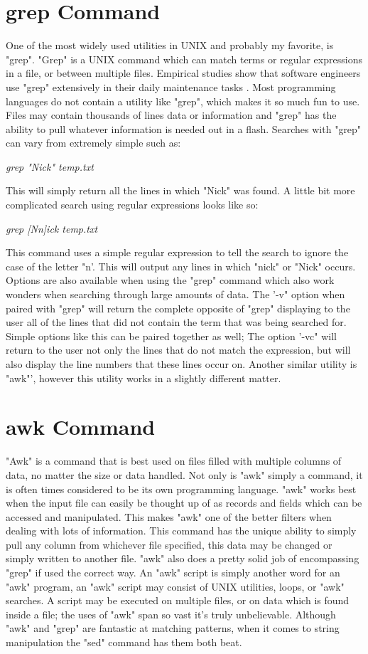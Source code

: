 \documentclass{article}
\begin{document}
\section{grep Command}       
One of the most widely used utilities in UNIX and probably my favorite, is "grep". "Grep" is a UNIX 
command which can match terms or regular expressions in a file, or between multiple files. Empirical 
studies show that software engineers use "grep" extensively in their daily maintenance tasks \cite{singer1997s}. Most programming languages do not contain a utility like "grep", which makes it so 
much fun to use. Files may contain thousands of lines data or information and "grep" has the ability to pull 
whatever information is needed out in a flash. Searches with "grep" can vary from extremely simple such 
as:\par
\textit{\large grep "Nick" temp.txt}\par 
This will simply return all the lines in which "Nick" was found. A little bit more complicated search using 
regular expressions looks like so:\par   
\textit{\large grep [Nn]ick temp.txt}\par
This command uses a simple regular expression to tell the search to ignore the case of the letter "n'. This 
will output any lines in which "nick" or "Nick" occurs. Options are also available when using the "grep" 
command which also work wonders when searching through large amounts of data. The '-v" option 
when paired with "grep" will return the complete opposite of "grep" displaying to the user all of the lines 
that did not contain the term that was being searched for. Simple options like this can be paired 
together as well; The option '-vc" will return to the user not only the lines that do not match the 
expression, but will also display the line numbers that these lines occur on. Another similar utility is 
"awk"', however this utility works in a slightly different matter.
\section{awk Command}
		"Awk" is a command that is best used on files filled with multiple columns of data, no matter the 
size or data handled. Not only is "awk" simply a command, it is often times considered to be its own 
programming language. "awk" works best when the input file can easily be thought up of as records and 
fields which can be accessed and manipulated. This makes "awk" one of the better filters when dealing 
with lots of information. This command has the unique ability to simply pull any column from whichever 
file specified, this data may be changed or simply written to another file. "awk" also does a pretty solid job 
of encompassing "grep" if used the correct way. An "awk" script is simply another word for an "awk" program, 
an "awk" script may consist of UNIX utilities, loops, or "awk" searches. A script may be executed on multiple 
files, or on data which is found inside a file; the uses of "awk" span so vast it's truly unbelievable. Although 
"awk" and "grep" are fantastic at matching patterns, when it comes to string manipulation the "sed" 
command has them both beat.
\end{document}
